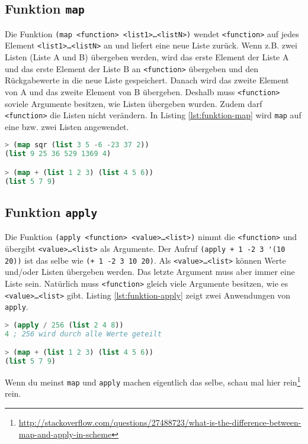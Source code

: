 \subsection{Funktion \texttt{map}}

Die Funktion \verb|(map <function> <list1>…<listN>)| wendet \verb|<function>| auf jedes Element \verb|<list1>…<listN>| an und liefert eine neue Liste zurück. Wenn z.B. zwei Listen (Liste A und B) übergeben werden, wird das erste Element der Liste A und das erste Element der Liste B an \verb|<function>| übergeben und den Rückgabewerte in die neue Liste gespeichert. Danach wird das zweite Element von A und das zweite Element von B übergeben. Deshalb muss \verb|<function>| soviele Argumente besitzen, wie Listen übergeben wurden. Zudem darf \verb|<function>| die Listen nicht verändern. In Listing \ref{lst:funktion-map} wird \verb|map| auf eine bzw. zwei Listen angewendet.

\begin{lstlisting}[language=Lisp, caption=Funktion map, label=lst:funktion-map]
> (map sqr (list 3 5 -6 -23 37 2))
(list 9 25 36 529 1369 4)

> (map + (list 1 2 3) (list 4 5 6))
(list 5 7 9)
\end{lstlisting}

\subsection{Funktion \texttt{apply}}

Die Funktion \verb|(apply <function> <value>…<list>)| nimmt die \verb|<function>| und übergibt \verb|<value>…<list>| als Argumente. Der Aufruf \verb|(apply + 1 -2 3 '(10 20))| ist das selbe wie \verb|(+ 1 -2 3 10 20)|. Als \verb|<value>…<list>| können Werte und/oder Listen übergeben werden. Das letzte Argument muss aber immer eine Liste sein. Natürlich muss \verb|<function>| gleich viele Argumente besitzen, wie es \verb|<value>…<list>| gibt. Listing \ref{lst:funktion-apply} zeigt zwei Anwendungen von \verb|apply|.

\begin{lstlisting}[language=Lisp, caption=Funktion apply, label=lst:funktion-apply]
> (apply / 256 (list 2 4 8))
4 ; 256 wird durch alle Werte geteilt

> (map + (list 1 2 3) (list 4 5 6))
(list 5 7 9)
\end{lstlisting}

Wenn du meinst \verb|map| und \verb|apply| machen eigentlich das selbe, schau mal hier rein\footnote{\href{http://stackoverflow.com/questions/27488723/what-is-the-difference-between-map-and-apply-in-scheme}{http://stackoverflow.com/questions/27488723/what-is-the-difference-between-map-and-apply-in-scheme}} rein.

